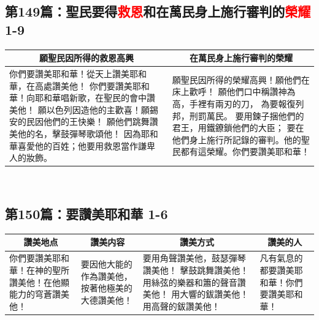 \subsection{第149篇：聖民要得\textcolor{red}{救恩}和在萬民身上施行審判的\textcolor{red}{榮耀} 1-9}
\begin{table}[H]
\centering
\begin{tabular}{p{9cm}|p{7.5cm}}\hline\hline
\multicolumn{1}{c|}{願聖民因所得的救恩高興}&\multicolumn{1}{c}{在萬民身上施行審判的榮耀}\\\hline
你們要讚美耶和華！從天上讚美耶和華，在高處讚美他！
你們要讚美耶和華！向耶和華唱新歌，在聖民的會中讚美他！
願以色列因造他的主歡喜！願錫安的民因他們的王快樂！
願他們跳舞讚美他的名，擊鼓彈琴歌頌他！
因為耶和華喜愛他的百姓；他要用救恩當作謙卑人的妝飾。
&願聖民因所得的榮耀高興！願他們在床上歡呼！
願他們口中稱讚神為高，手裡有兩刃的刀，
為要報復列邦，刑罰萬民。
要用鍊子捆他們的君王，用鐵鐐鎖他們的大臣；
要在他們身上施行所記錄的審判。他的聖民都有這榮耀。你們要讚美耶和華！\\\hline
\end{tabular}
\end{table} 


\subsection{第150篇：要讚美耶和華 1-6}
\begin{table}[H]
\centering
\begin{tabular}{p{3.5cm}|p{2.9cm}|p{6.75cm}|p{3.00cm}}\hline\hline
\multicolumn{1}{c|}{讚美地点}&\multicolumn{1}{c|}{讚美内容}&\multicolumn{1}{c|}{讚美方式}&\multicolumn{1}{c}{讚美的人}\\\hline
你們要讚美耶和華！在神的聖所讚美他！在他顯能力的穹蒼讚美他！
&要因他大能的作為讚美他，按著他極美的大德讚美他！
&要用角聲讚美他，鼓瑟彈琴讚美他！
擊鼓跳舞讚美他！用絲弦的樂器和簫的聲音讚美他！
用大響的鈸讚美他！用高聲的鈸讚美他！
&凡有氣息的都要讚美耶和華！你們要讚美耶和華！\\\hline
\end{tabular}
\end{table} 








